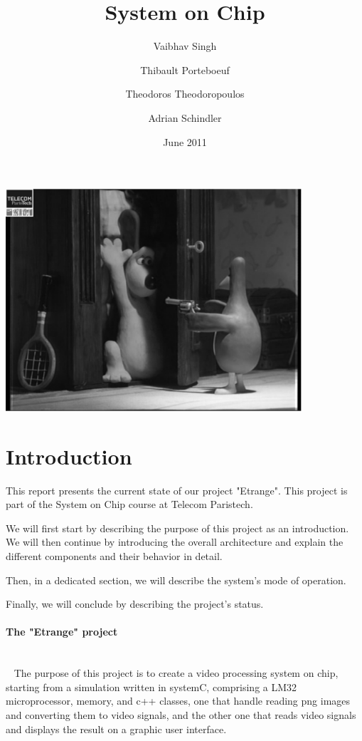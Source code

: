 \documentclass[a4paper,10pt]{article}
\begin{document}
\title{System on Chip}

\author{Vaibhav Singh \and Thibault Porteboeuf \and Theodoros
Theodoropoulos \and Adrian Schindler}

\date{June 2011}
\maketitle

\vfill
\begin{center}
\includegraphics[width=11cm]{figs/wallace.pdf}
\end{center}
\vfill

\newpage

\tableofcontents

\newpage
\section{Introduction} 

This report presents the current state of our project "Etrange". This project is part of the System on Chip course at Telecom Paristech.

We will first start by describing the purpose of this project as an introduction. We will then continue by introducing the overall architecture and explain the different components and their behavior in detail.

Then, in a dedicated section, we will describe the system's mode of operation.

Finally, we will conclude by describing the project's status.


\paragraph{The "Etrange" project}
~\\~
The purpose of this project is to create a video processing system on chip, starting from a simulation written in systemC, comprising a LM32 microprocessor, memory, and c++ classes, one that handle reading png images and converting them to video signals, and the other one that reads video signals and displays the result on a graphic user interface.
\end{document}
